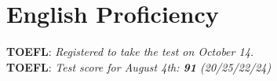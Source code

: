 \section{\sc English Proficiency}
\textbf{TOEFL}{: \textit{Registered to take the test on October 14.}}
\\
\textbf{TOEFL}{: \textit{Test score for August 4th: \textbf{91} (20/25/22/24)}}\\
\endinput